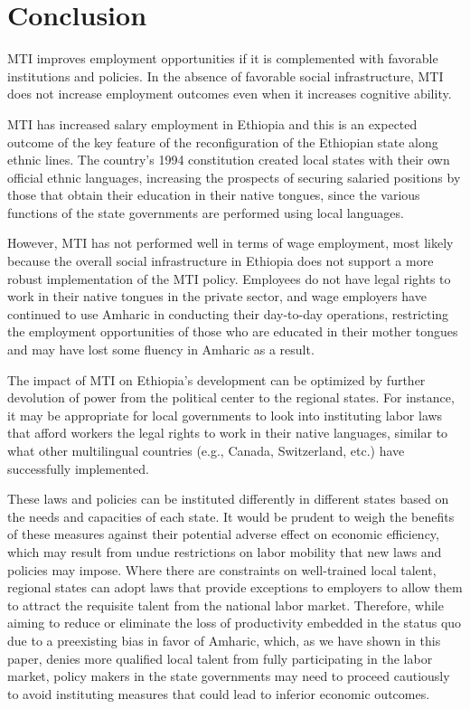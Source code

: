 
\section{Conclusion}

MTI improves employment opportunities if it is complemented with favorable institutions and policies. In the absence of favorable social infrastructure, MTI does not increase employment outcomes even when it increases cognitive ability.  

MTI has increased salary employment in Ethiopia and this is an expected outcome of the key feature of the reconfiguration of the Ethiopian state along ethnic lines. The country's 1994 constitution created local states with their own official ethnic languages, increasing the prospects of securing salaried positions by those that obtain their education in their native tongues, since the various functions of the state governments are performed using local languages. 

However, MTI has not performed well in terms of wage employment, most likely because the overall social infrastructure in Ethiopia does not support a more robust implementation of the MTI policy. Employees do not have legal rights to work in their native tongues in the private sector, and wage employers have continued to use Amharic in conducting their day-to-day operations, restricting the employment opportunities of those who are educated in their mother tongues and may have lost some fluency in Amharic as a result. 

The impact of MTI on Ethiopia’s development can be optimized by further devolution of power from the political center to the regional states. For instance, it may be appropriate for local governments to look into instituting labor laws that afford workers the legal rights to work in their native languages, similar to what other multilingual countries (e.g., Canada, Switzerland, etc.) have successfully implemented. 

These laws and policies can be instituted differently in different states based on the needs and capacities of each state. It would be prudent to weigh the benefits of these measures against their potential adverse effect on economic efficiency, which may result from undue restrictions on labor mobility that new laws and policies may impose. Where there are constraints on well-trained local talent, regional states can adopt laws that provide exceptions to employers to allow them to attract the requisite talent from the national labor market. Therefore, while aiming to reduce or eliminate the loss of productivity embedded in the status quo due to a preexisting bias in favor of Amharic, which, as we have shown in this paper, denies more qualified local talent from fully participating in the labor market, policy makers in the state governments may need to proceed cautiously to avoid instituting measures that could lead to inferior economic outcomes.
